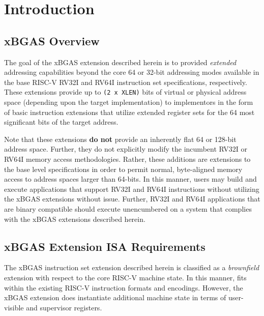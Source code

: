 \documentclass{article}
\begin{document}
\clearpage
\listoffigures
\listoftables
\clearpage

\clearpage
\section{Introduction}

\subsection{xBGAS Overview}

The goal of the \gls{xBGAS} extension described herein is to provided \textit{extended} 
addressing capabilities beyond the core 64 or 32-bit addressing modes available in the 
base RISC-V RV32I and RV64I instruction set specifications, respectively.  These extensions provide up 
to \texttt{(2 x XLEN)} bits of virtual or physical address space (depending upon the target implementation) 
to implementors in the form of basic instruction extensions that utilize extended 
register sets for the 64 most significant bits of the target address.  

Note that these extensions \textbf{do not} provide an inherently flat 64 or 128-bit address space.  
Further, they do not explicitly modify the incumbent RV32I or RV64I memory access 
methodologies.  Rather, these additions are extensions to the base level specifications in order to 
permit normal, byte-aligned memory access to address spaces larger than 64-bits.  In 
this manner, users may build and execute applications that support RV32I and RV64I 
instructions without utilizing the xBGAS extensions without issue.  Further, RV32I and RV64I 
applications that are binary compatible should execute unencumbered on a system that 
complies with the xBGAS extensions described herein.

\subsection{xBGAS Extension ISA Requirements}

The xBGAS instruction set extension described herein is classified 
as a \textit{brownfield} extension with respect to the core RISC-V 
machine state.  In this manner, fits within the existing RISC-V instruction 
formats and encodings.  However, the xBGAS extension does instantiate 
additional machine state in terms of user-visible and supervisor registers.
\end{document}
